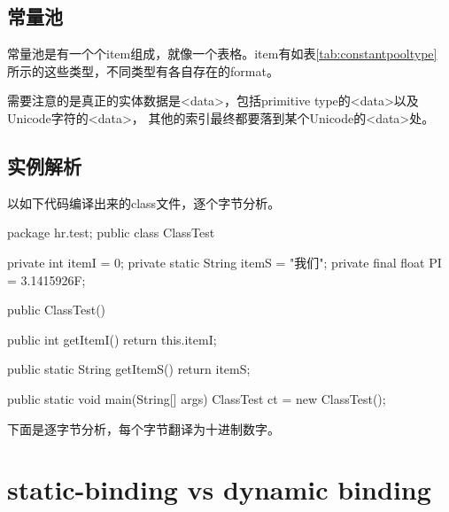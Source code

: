\documentclass[a4paper,11pt]{article}
\begin{document}
\subsection[常量池]{常量池}
\label{sec:constantpool}
常量池是有一个个item组成，就像一个表格。item有如表\ref{tab:constantpooltype}
所示的这些类型，不同类型有各自存在的format。



需要注意的是真正的实体数据是<data>，包括primitive type的<data>以及Unicode字符的<data>，
其他的索引最终都要落到某个Unicode的<data>处。

\subsection[实例解析]{实例解析}
以如下代码编译出来的class文件，逐个字节分析。

\begin{javacode}
package hr.test;
public class ClassTest {
  private int itemI = 0;
  private static String itemS = "我们";
  private final float PI = 3.1415926F;

  public ClassTest() { }

  public int getItemI() {
    return this.itemI;
  }

  public static String getItemS() {
    return itemS;
  }

  public static void main(String[] args) {
    ClassTest ct = new ClassTest();
  }
}
\end{javacode}

下面是逐字节分析，每个字节翻译为十进制数字。




\section[static-binding vs dynamic binding]{static-binding vs dynamic binding}
\end{document}

